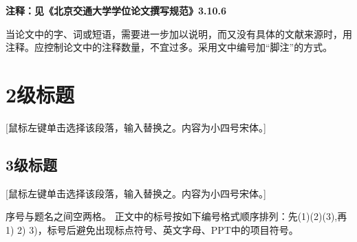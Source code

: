 \textbf{注释：见《北京交通大学学位论文撰写规范》3.10.6}

当论文中的字、词或短语，需要进一步加以说明，而又没有具体的文献来源时，用注释。应控制论文中的注释数量，不宜过多。采用文中编号加“脚注”的方式。

\section{2级标题}
 [鼠标左键单击选择该段落，输入替换之。内容为小四号宋体。]

\subsection{3级标题}
[鼠标左键单击选择该段落，输入替换之。内容为小四号宋体。]

序号与题名之间空两格。
正文中的标号按如下编号格式顺序排列：先(1)(2)(3),再1) 2) 3)，标号后避免出现标点符号、英文字母、PPT中的项目符号。

